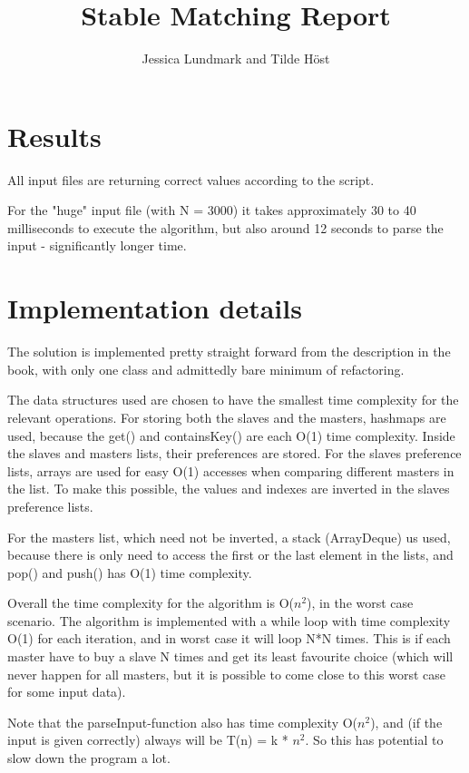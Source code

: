 \documentclass{article}
\title{Stable Matching Report}
\author{Jessica Lundmark and Tilde Höst}
\begin{document}
  \maketitle

  \section{Results}
  
  All input files are returning correct values according to the script.
  
  For the "huge" input file (with N = 3000) it takes approximately 30 to 40 milliseconds to execute the algorithm, but also around 12 seconds to parse the input - significantly longer time.
 
  \section{Implementation details}
  
  The solution is implemented pretty straight forward from the description in the book, with only one class and admittedly bare minimum of refactoring.
  
  The data structures used are chosen to have the smallest time complexity for the relevant operations. For storing both the slaves and the masters, hashmaps are used, because the get() and containsKey() are each O(1) time complexity.
  Inside the slaves and masters lists, their preferences are stored. For the slaves preference lists, arrays are used for easy O(1) accesses when comparing different masters in the list. To make this possible, the values and indexes are inverted in the slaves preference lists.
  
  For the masters list, which need not be inverted, a stack (ArrayDeque) us used, because there is only need to access the first or the last element in the lists, and pop() and push() has O(1) time complexity.
  
  Overall the time complexity for the algorithm is O($n^2$), in the worst case scenario. The algorithm is implemented with a while loop with time complexity O(1) for each iteration, and in worst case it will loop N*N times. This is if each master have to buy a slave N times and get its least favourite choice (which will never happen for all masters, but it is possible to come close to this worst case for some input data).
  
  Note that the parseInput-function also has time complexity O($n^2$), and (if the input is given correctly) always will be T(n) = k * $n^2$. So this has potential to slow down the program a lot.
\end{document}
